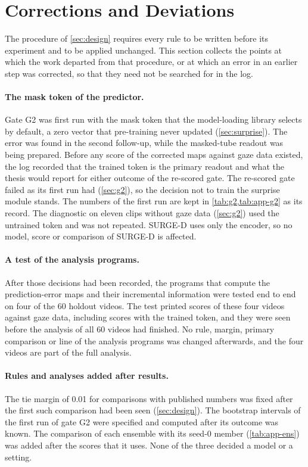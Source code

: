 \section{Corrections and Deviations}\label{sec:deviations}

The procedure of \cref{sec:design} requires every rule to be written before
its experiment and to be applied unchanged. This section collects the points
at which the work departed from that procedure, or at which an error in an
earlier step was corrected, so that they need not be searched for in the log.

\paragraph{The mask token of the predictor.} Gate G2 was first run with the
mask token that the model-loading library selects by default, a zero vector
that pre-training never updated (\cref{sec:surprise}). The error was found in
the second follow-up, while the masked-tube readout was being prepared. Before
any score of the corrected maps against gaze data existed, the log recorded
that the trained token is the primary readout and what the thesis would report
for either outcome of the re-scored gate. The re-scored gate failed as its
first run had (\cref{sec:g2}), so the decision not to train the surprise
module stands. The numbers of the first run are kept in
\cref{tab:g2,tab:app-g2} as its record. The diagnostic on eleven clips without gaze data (\cref{sec:g2}) used
the untrained token and was not repeated. SURGE-D uses only the encoder, so no
model, score or comparison of SURGE-D is affected.

\paragraph{A test of the analysis programs.} After those decisions had been
recorded, the programs that compute the prediction-error maps and their
incremental information were tested end to end on four of the 60 holdout
videos. The test printed scores of these four videos against gaze data,
including scores with the trained token, and they were seen before the analysis
of all 60 videos had finished. No rule, margin, primary comparison or line of
the analysis programs was changed afterwards, and the four videos are part of
the full analysis.

\paragraph{Rules and analyses added after results.} The tie margin of 0.01
for comparisons with published numbers was fixed after the first such
comparison had been seen (\cref{sec:design}). The bootstrap intervals of the
first run of gate G2 were specified and computed after its outcome was known.
The comparison of each ensemble with its seed-0 member (\cref{tab:app-ens}) was
added after the scores that it uses. None of the three decided a model or a
setting.

